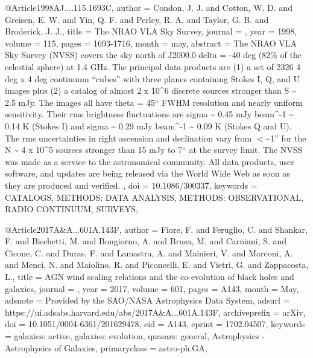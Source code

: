 \documentclass[longauth]{aa}
\begin{document}
{{{{@Article{1998AJ....115.1693C,
  author   = {Condon, J. J. and Cotton, W. D. and Greisen, E. W. and Yin, Q. F. and Perley, R. A. and Taylor, G. B. and Broderick, J. J.},
  title    = {The NRAO VLA Sky Survey},
  journal  = {\aj},
  year     = {1998},
  volume   = {115},
  pages    = {1693-1716},
  month    = may,
  abstract = {The NRAO VLA Sky Survey (NVSS) covers the sky north of J2000.0 delta =
-40 deg (82\% of the celestial sphere) at 1.4 GHz. The principal data
products are (1) a set of 2326 4 deg x 4 deg continuum ``cubes'' with
three planes containing Stokes I, Q, and U images plus (2) a catalog of
almost 2 x 10\^{}6 discrete sources stronger than S \~{} 2.5 mJy. The images
all have theta = 45`` FWHM resolution and nearly uniform sensitivity.
Their rms brightness fluctuations are sigma \~{} 0.45 mJy beam\^{}-1 \~{} 0.14 K
(Stokes I) and sigma \~{} 0.29 mJy beam\^{}-1 \~{} 0.09 K (Stokes Q and U). The
rms uncertainties in right ascension and declination vary from $\lt$\~{}1''
for the N \~{} 4 x 10\^{}5 sources stronger than 15 mJy to 7`` at the survey
limit. The NVSS was made as a service to the astronomical community. All
data products, user software, and updates are being released via the
World Wide Web as soon as they are produced and verified.
},
  doi      = {10.1086/300337},
  keywords = {CATALOGS, METHODS: DATA ANALYSIS, METHODS: OBSERVATIONAL, RADIO CONTINUUM, SURVEYS},
}

@Article{2017A&A...601A.143F,
  author        = {{Fiore}, F. and {Feruglio}, C. and {Shankar}, F. and {Bischetti}, M. and {Bongiorno}, A. and {Brusa}, M. and {Carniani}, S. and {Cicone}, C. and {Duras}, F. and {Lamastra}, A. and {Mainieri}, V. and {Marconi}, A. and {Menci}, N. and {Maiolino}, R. and {Piconcelli}, E. and {Vietri}, G. and {Zappacosta}, L.},
  title         = {AGN wind scaling relations and the co-evolution of black holes and galaxies},
  journal       = {\aap},
  year          = {2017},
  volume        = {601},
  pages         = {A143},
  month         = {May},
  adsnote       = {Provided by the SAO/NASA Astrophysics Data System},
  adsurl        = {https://ui.adsabs.harvard.edu/abs/2017A&A...601A.143F},
  archiveprefix = {arXiv},
  doi           = {10.1051/0004-6361/201629478},
  eid           = {A143},
  eprint        = {1702.04507},
  keywords      = {galaxies: active, galaxies: evolution, quasars: general, Astrophysics - Astrophysics of Galaxies},
  primaryclass  = {astro-ph.GA},
}

}}}}
\end{document}
